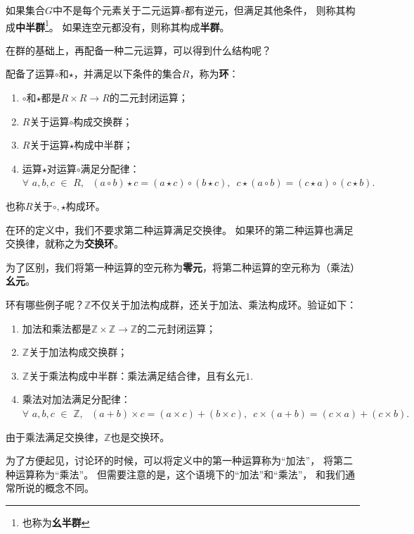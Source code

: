 \documentclass[12pt,UTF8]{ctexbook}
\begin{document}
\begin{appendix}
如果集合$G$中不是每个元素关于二元运算$\circ$都有逆元，但满足其他条件，
则称其构成\textbf{中半群}\footnote{也称为\textbf{幺半群}}。
如果连空元都没有，则称其构成\textbf{半群}。

在群的基础上，再配备一种二元运算，可以得到什么结构呢？

\begin{df}\label{df:0_2}
    配备了运算$\circ$和$\star$，并满足以下条件的集合$R$，称为\textbf{环}：

    \begin{enumerate}
        \item $\circ$和$\star$都是$R \times R \rightarrow R$的二元封闭运算；
        \item $R$关于运算$\circ$构成交换群；
        \item $R$关于运算$\star$构成中半群；
        \item 运算$\star$对运算$\circ$满足分配律：$\forall \,\, a, b, c \,\, \in \,\, R, \,\,\,\, (a \circ b) \star c = (a \star c) \circ (b \star c), \,\,\, c\star (a \circ b) = (c \star a) \circ (c \star b).$
    \end{enumerate}
    也称$R$关于$\circ, \star$构成环。
\end{df}

在环的定义中，我们不要求第二种运算满足交换律。
如果环的第二种运算也满足交换律，就称之为\textbf{交换环}。

为了区别，我们将第一种运算的空元称为\textbf{零元}，将第二种运算的空元称为（乘法）\textbf{幺元}。

环有哪些例子呢？$\mathbb{Z}$不仅关于加法构成群，还关于加法、乘法构成环。验证如下：

\begin{enumerate}
    \item 加法和乘法都是$\mathbb{Z} \times \mathbb{Z} \rightarrow \mathbb{Z}$的二元封闭运算；
    \item $\mathbb{Z}$关于加法构成交换群；
    \item $\mathbb{Z}$关于乘法构成中半群：乘法满足结合律，且有幺元$1$.
    \item 乘法对加法满足分配律：$\forall \,\, a, b, c \,\, \in \,\, \mathbb{Z}, \,\,\,\, (a + b) \times c = (a \times c) + (b \times c), \,\,\, c \times (a + b) = (c \times a) + (c \times b).$
\end{enumerate}

由于乘法满足交换律，$\mathbb{Z}$也是交换环。

为了方便起见，讨论环的时候，可以将定义中的第一种运算称为“加法”，
将第二种运算称为“乘法”。
但需要注意的是，这个语境下的“加法”和“乘法”，
和我们通常所说的概念不同。


\end{appendix}
\end{document}
